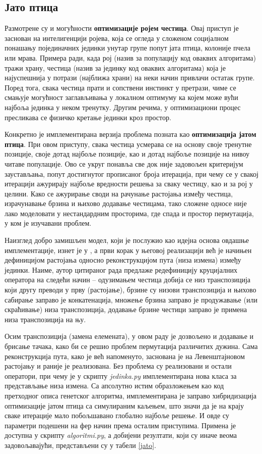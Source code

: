 \documentclass[a4paper]{article}
\begin{document}
\subsection{Јато птица}

Размотрене су и могућности \textbf{оптимизације ројем честица}. Овај приступ је заснован на интелигенцији ројева, која се огледа у сложеном социјалном понашању појединачних јединки унутар групе попут јата птица, колоније пчела или мрава. Примера ради, када рој (назив за популацију код оваквих алгоритама) тражи храну, честица (назив за јединку код оваквих алгоритама) која је најуспешнија у потрази (најближа храни) на неки начин привлачи остатак групе. Поред тога, свака честица прати и сопствени инстинкт у претрази, чиме се смањује могућност заглављивања у локалном оптимуму ка којем може вући најбоља јединка у неком тренутку. Другим речима, у оптимизациони процес пресликава се физичко кретање јединки кроз простор.

Конкретно је имплементирана верзија проблема позната као \textbf{оптимизација јатом птица}. При овом приступу, свака честица усмерава се на основу своје тренутне позиције, своје дотад најбоље позиције, као и дотад најбоље позиције на нивоу читаве популације. Ово се укруг понавља све док није задовољен критеријум заустављања, попут достигнутог прописаног броја итерација, при чему се у свакој итерацији ажурирају најбоље вредности решења за сваку честицу, као и за рој у целини. Како се ажурирање своди на рачунање растојања између честица, израчунавање брзина и њихово додавање честицама, тако сложене односе није лако моделовати у нестандардним просторима, где спада и простор пермутација, у ком је изучавани проблем.

Наизглед добро замишљен модел, који је послужио као идејна основа овдашње имплементације, изнет је у \cite{clerc}, а први корак у његовој реализацији већ је начињен дефиницијом растојања односно реконструкцијом пута (низа измена) између јединки. Наиме, аутор цитираног рада предлаже редефиницију круцијалних оператора на следећи начин -- одузимањем честица добија се низ транспозиција који другу преводи у прву (растојање), брзине су низови транспозиција и њихово сабирање заправо је конкатенација, множење брзина заправо је продужавање (или скраћивање) низа транспозиција, додавање брзине честици заправо је примена низа транспозиција на њу.

Осим транспозиција (замена елемената), у овом раду је дозвољено и додавање и брисање тачака, како би се решио проблем пермутација различитих дужина. Сама реконструкција пута, како је већ напоменуто, заснована је на Левенштајновом растојању и раније је реализована. Без проблема су реализовани и остали оператори, при чему је у скрипту \textit{jedinka.py} имплементирана нова класа за представљање низа измена. Са апсолутно истим образложењем као код претходног описа генетског алгоритма, имплементирана је заправо хибридизација оптимизације јатом птица са симулираним каљењем, што значи да је на крају сваке итерације мало побољшавано глобално најбоље решење. И овде су параметри подешени на фер начин према осталим приступима. Примена је доступна у скрипту \textit{algoritmi.py}, а добијени резултати, који су иначе веома задовољавајући, представљени су у табели \ref{jato}.
\end{document}
